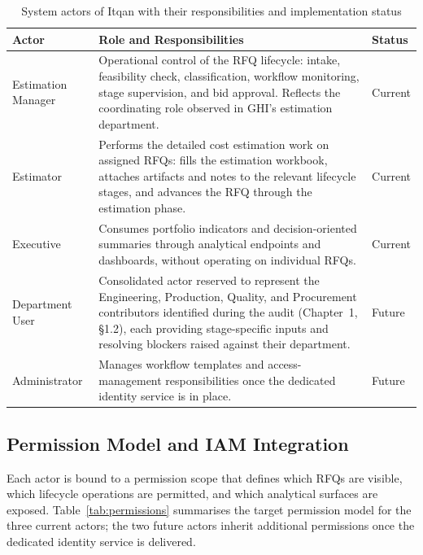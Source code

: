 \begin{table}[H]
\centering
\renewcommand{\arraystretch}{1.4}
\begin{tabularx}{\textwidth}{|p{2.9cm}|>{\RaggedRight\arraybackslash}X|p{1.8cm}|}
\hline
\rowcolor{lightgray}
\textbf{Actor} & \textbf{Role and Responsibilities} & \textbf{Status} \\ \hline
Estimation Manager & Operational control of the RFQ lifecycle: intake, feasibility check, classification, workflow monitoring, stage supervision, and bid approval. Reflects the coordinating role observed in GHI's estimation department. & Current \\ \hline
Estimator & Performs the detailed cost estimation work on assigned RFQs: fills the estimation workbook, attaches artifacts and notes to the relevant lifecycle stages, and advances the RFQ through the estimation phase. & Current \\ \hline
Executive & Consumes portfolio indicators and decision-oriented summaries through analytical endpoints and dashboards, without operating on individual RFQs. & Current \\ \hline
Department User & Consolidated actor reserved to represent the Engineering, Production, Quality, and Procurement contributors identified during the audit (Chapter~1, §1.2), each providing stage-specific inputs and resolving blockers raised against their department. & Future \\ \hline
Administrator & Manages workflow templates and access-management responsibilities once the dedicated identity service is in place. & Future \\ \hline
\end{tabularx}
\caption{System actors of Itqan with their responsibilities and implementation status}
\label{tab:actors}
\end{table}

\subsection{Permission Model and IAM Integration}
Each actor is bound to a permission scope that defines which RFQs are
visible, which lifecycle operations are permitted, and which
analytical surfaces are exposed. Table~\ref{tab:permissions} summarises
the target permission model for the three current actors; the two
future actors inherit additional permissions once the dedicated
identity service is delivered.

